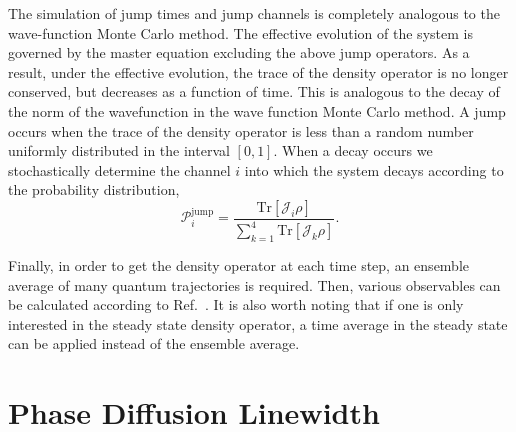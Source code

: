 \documentclass[aps,
twocolumn,
showpacs,
superscriptaddress,groupedaddress]{revtex4}
\begin{document}
The simulation of jump times and jump channels is completely analogous
to the wave-function Monte Carlo method. The effective evolution of the
system is governed by the master equation excluding the above jump
operators. As a result, under the effective evolution, the trace of the
density operator is no longer conserved, but decreases as a function of
time.  This is analogous to the decay of the norm of the wavefunction in
the wave function Monte Carlo method. A jump occurs when the trace of
the density operator is less than a random number uniformly distributed
in the interval $[0,1]$. When a decay occurs we stochastically determine
the channel $i$ into which the system decays according to the
probability distribution,
\begin{equation}
\mathcal{P}_i^{\mathrm{jump}}=\frac{\mathrm{Tr}[\mathcal{J}_i\rho]}{\sum_{k=1}^4
\mathrm{Tr}[\mathcal{J}_k\rho]}.
\end{equation}

Finally, in order to get the density operator at each time step, an
ensemble average of many quantum trajectories is required. Then, various
observables can be calculated according to Ref.~\cite{PhysRevA.87.062101}. It is
also worth noting that if one is only interested in the steady state
density operator, a time average in the steady state can be applied
instead of the ensemble average.

\section{Phase Diffusion Linewidth}
\label{HakenAppendix}
\end{document}
